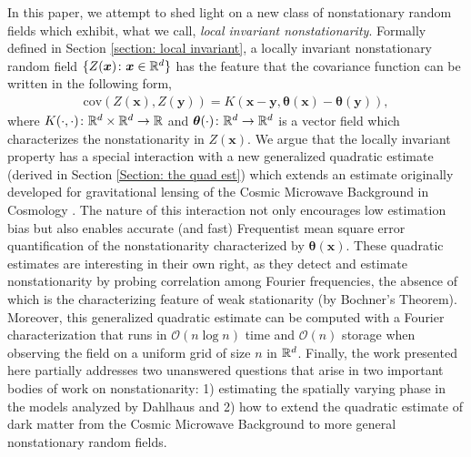 \documentclass[10pt,noinfoline]{imsart}
\newcommand{\bs}{\boldsymbol}
\begin{document}
In this paper, we attempt to shed light on a new class of nonstationary random fields which exhibit, what we call, {\em local invariant nonstationarity}. Formally defined in Section \ref{section: local invariant}, a locally invariant nonstationary random field $\{Z(\bs x)\colon \bs x\in \Bbb R^d\}$ has the feature that the covariance function can be written in the following form,
\begin{align*}
\text{cov}(Z(\bs x), Z(\bs y))=K(\bs x-\bs y, \bs \theta(\bs x)-\bs \theta(\bs y)),
\end{align*}
where $K(\cdot, \cdot)\colon \Bbb R^d\times \Bbb R^d \rightarrow \Bbb R$ and $\bs\theta(\cdot) \colon \Bbb R^d\rightarrow \Bbb R^d$ is a vector field which characterizes the nonstationarity in $Z(\bs x)$. We argue that the locally invariant property has a special interaction with a new  generalized quadratic estimate (derived in Section \ref{Section: the quad est}) which extends an estimate originally developed for gravitational lensing of the Cosmic Microwave Background in Cosmology \cite{hu2001mapping, hu2002mass}. The nature of this interaction not only encourages low estimation bias but also enables accurate (and fast) Frequentist mean square error quantification of the nonstationarity characterized by $\bs \theta(\bs x)$. These quadratic estimates are interesting in their own right, as they detect and estimate nonstationarity by probing correlation among Fourier frequencies, the absence of which is the characterizing feature of weak stationarity (by Bochner's Theorem). Moreover, this generalized quadratic estimate can be computed with a Fourier characterization that runs in $\mathcal O(n\log n)$ time and $\mathcal O(n)$ storage when observing the field on a uniform grid of size $n$ in $\Bbb R^d $. Finally, the work presented here partially addresses two unanswered questions that arise in two important bodies of work on nonstationarity: 1) estimating the spatially varying phase in the models analyzed by Dahlhaus \cite{dahlhaus1997fitting,dahlhaus2000likelihood} and 2) how to extend the quadratic estimate of dark matter from the Cosmic Microwave Background to more general nonstationary random fields.
\end{document}
